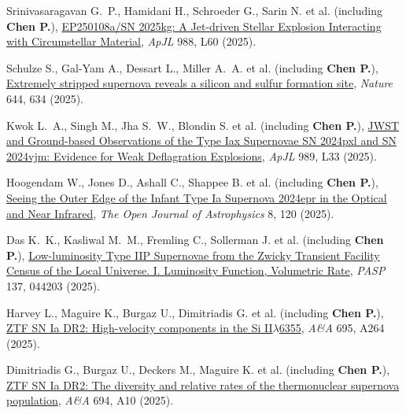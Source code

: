 \item Srinivasaragavan G.~P., Hamidani H., Schroeder G., Sarin N. et al. (including \textbf{Chen P.}), \href{https://ui.adsabs.harvard.edu/abs/2025ApJ...988L..60S}{EP250108a/SN 2025kg: A Jet-driven Stellar Explosion Interacting with Circumstellar Material}, \textit{ApJL} 988, L60 (2025).

\item Schulze S., Gal-Yam A., Dessart L., Miller A.~A. et al. (including \textbf{Chen P.}), \href{https://ui.adsabs.harvard.edu/abs/2025Natur.644..634S}{Extremely stripped supernova reveals a silicon and sulfur formation site}, \textit{Nature} 644, 634 (2025).

\item Kwok L.~A., Singh M., Jha S.~W., Blondin S. et al. (including \textbf{Chen P.}), \href{https://ui.adsabs.harvard.edu/abs/2025ApJ...989L..33K}{JWST and Ground-based Observations of the Type Iax Supernovae SN 2024pxl and SN 2024vjm: Evidence for Weak Deflagration Explosions}, \textit{ApJL} 989, L33 (2025).

\item Hoogendam W., Jones D., Ashall C., Shappee B. et al. (including \textbf{Chen P.}), \href{https://ui.adsabs.harvard.edu/abs/2025OJAp....8E.120H}{Seeing the Outer Edge of the Infant Type Ia Supernova 2024epr in the Optical and Near Infrared}, \textit{The Open Journal of Astrophysics} 8, 120 (2025).

\item Das K.~K., Kasliwal M.~M., Fremling C., Sollerman J. et al. (including \textbf{Chen P.}), \href{https://ui.adsabs.harvard.edu/abs/2025PASP..137d4203D}{Low-luminosity Type IIP Supernovae from the Zwicky Transient Facility Census of the Local Universe. I. Luminosity Function, Volumetric Rate}, \textit{PASP} 137, 044203 (2025).

\item Harvey L., Maguire K., Burgaz U., Dimitriadis G. et al. (including \textbf{Chen P.}), \href{https://ui.adsabs.harvard.edu/abs/2025A&A...695A.264H}{ZTF SN Ia DR2: High-velocity components in the Si II{\ensuremath{\lambda}}6355}, \textit{A\&A} 695, A264 (2025).

\item Dimitriadis G., Burgaz U., Deckers M., Maguire K. et al. (including \textbf{Chen P.}), \href{https://ui.adsabs.harvard.edu/abs/2025A&A...694A..10D}{ZTF SN Ia DR2: The diversity and relative rates of the thermonuclear supernova population}, \textit{A\&A} 694, A10 (2025).

